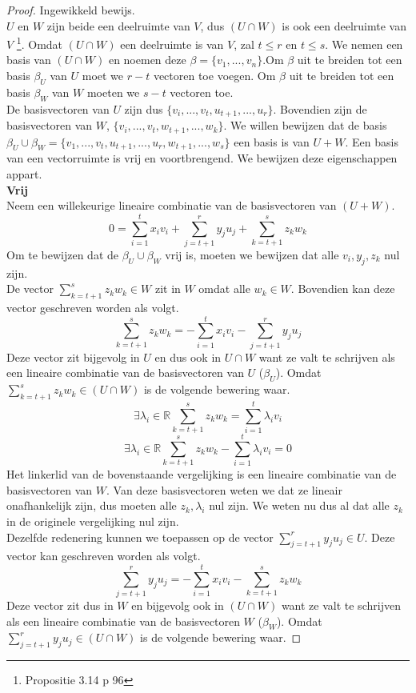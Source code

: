 \documentclass[lineaire_algebra_oplossingen.tex]{subfiles}
\begin{document}
\begin{proof}
Ingewikkeld bewijs.\\
$U$ en $W$ zijn beide een deelruimte van $V$, dus $(U \cap W)$ is ook een deelruimte van $V$ \footnote{Propositie 3.14 p 96}. Omdat $(U \cap W)$ een deelruimte is van $V$, zal $t \le r$ en $t \le s$. We nemen een basis van $(U\cap W)$ en noemen deze $\beta = \{v_1,...,v_n\}$.Om $\beta$ uit te breiden tot een basis $\beta_U$ van $U$ moet we $r-t$ vectoren toe voegen. Om $\beta$ uit te breiden tot een basis $\beta_W$ van $W$ moeten we $s-t$ vectoren toe.\\
De basisvectoren van $U$ zijn dus $\{v_i,...,v_t,u_{t+1},...,u_r\}$. Bovendien zijn de basisvectoren van $W$, $\{v_i,...,v_t,w_{t+1},...,w_k\}$.
We willen bewijzen dat de basis $\beta_U \cup \beta_W = \{v_1,...,v_t,u_{t+1},...,u_{r},w_{t+1},...,w_{s}\}$ een basis is van $U+W$.
Een basis van een vectorruimte is vrij en voortbrengend. We bewijzen deze eigenschappen appart.\\
\textbf{Vrij}\\
Neem een willekeurige lineaire combinatie van de basisvectoren van $(U+W)$.
\[
0 = \sum_{i=1}^tx_iv_i + \sum_{j=t+1}^ry_ju_j + \sum_{k=t+1}^sz_kw_k
\]
Om te bewijzen dat de $\beta_U \cup \beta_W$ vrij is, moeten we bewijzen dat alle $v_i,y_j,z_k$ nul zijn.\\
De vector $\sum_{k=t+1}^sz_kw_k \in W$ zit in $W$ omdat alle $w_k \in W$. Bovendien kan deze vector geschreven worden als volgt.
\[
\sum_{k=t+1}^sz_kw_k = -\sum_{i=1}^tx_iv_i - \sum_{j=t+1}^ry_ju_j
\]
Deze vector zit bijgevolg in $U$ en dus ook in $U\cap W$ want ze valt te schrijven als een lineaire combinatie van de basisvectoren van $U$ ($\beta_U$).
Omdat $\sum_{k=t+1}^sz_kw_k \in (U\cap W)$ is de volgende bewering waar.
\[
\exists \lambda_i \in \mathbb{R} \sum_{k=t+1}^sz_kw_k = \sum_{i=1}^t\lambda_iv_i
\]
\[
\exists \lambda_i \in \mathbb{R} \sum_{k=t+1}^sz_kw_k - \sum_{i=1}^t\lambda_iv_i = 0 
\]
Het linkerlid van de bovenstaande vergelijking is een lineaire combinatie van de basisvectoren van $W$. Van deze basisvectoren weten we dat ze lineair onafhankelijk zijn, dus moeten alle $z_k, \lambda_i$ nul zijn. We weten nu dus al dat alle $z_k$ in de originele vergelijking nul zijn.\\
Dezelfde redenering kunnen we toepassen op de vector $\sum_{j=t+1}^ry_ju_j \in U$. Deze vector kan geschreven worden als volgt.
\[
\sum_{j=t+1}^ry_ju_j= -\sum_{i=1}^tx_iv_i - \sum_{k=t+1}^sz_kw_k
\]
Deze vector zit dus in $W$ en bijgevolg ook in $(U\cap W)$ want ze valt te schrijven als een lineaire combinatie van de basisvectoren $W$ ($\beta_W$). Omdat $\sum_{j=t+1}^ry_ju_j \in (U\cap W)$ is de volgende bewering waar.

\end{proof}
\end{document}
